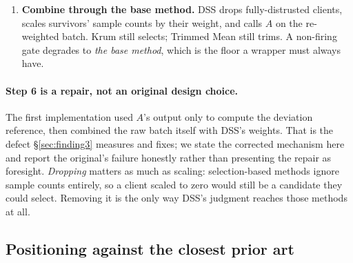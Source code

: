 \documentclass[11pt,a4paper]{article}
\begin{document}
\begin{enumerate}
  \item \textbf{Combine through the base method.} DSS drops
    fully-distrusted clients, scales survivors' sample counts by their
    weight, and calls $A$ on the re-weighted batch. Krum still selects;
    Trimmed Mean still trims. A non-firing gate degrades to \emph{the base
    method}, which is the floor a wrapper must always have.
\end{enumerate}

\paragraph{Step 6 is a repair, not an original design choice.}
The first implementation used $A$'s output only to compute the deviation
reference, then combined the raw batch itself with DSS's weights. That is
the defect \S\ref{sec:finding3} measures and fixes; we state the corrected
mechanism here and report the original's failure honestly rather than
presenting the repair as foresight. \emph{Dropping} matters as much as
scaling: selection-based methods ignore sample counts entirely, so a
client scaled to zero would still be a candidate they could select.
Removing it is the only way DSS's judgment reaches those methods at all.

\subsection{Positioning against the closest prior art}
\label{sec:novelty}
\end{document}
